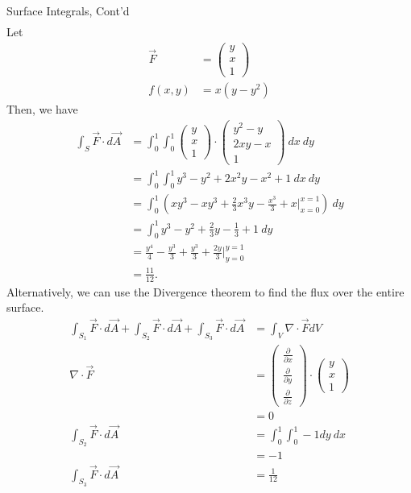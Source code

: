 \documentclass[8pt]{extarticle}
\begin{document}
\begin{problem}{Surface Integrals, Cont'd}
\begin{align*}
    \end{align*}
    Let
    \begin{align*}
      \vec{F} &= \begin{pmatrix}y\\x\\1\end{pmatrix}\\
      f(x,y) &= x(y-y^2) \tag*{$0\leq x,y \leq 1$}
    \end{align*}
    Then, we have
    \begin{align*}
      \int_{S}\vec{F} \cdot d\vec{A} &= \int_{0}^{1}\int_{0}^{1} \begin{pmatrix}y\\x\\1\end{pmatrix}\cdot \begin{pmatrix}y^2 - y\\2xy-x\\1\end{pmatrix}~dx~dy\\
                                     &= \int_{0}^{1}\int_{0}^{1} y^3 - y^2 + 2x^2y - x^2 + 1~dx~dy\\
                                     &= \int_{0}^{1} \left(xy^3 - xy^3 + \frac{2}{3}x^3y - \frac{x^3}{3} + x \biggr\vert_{x=0}^{x=1}\right)~dy\\
                                     &= \int_{0}^{1} y^3 - y^2 + \frac{2}{3}y - \frac{1}{3} + 1~dy\\
                                     &= \frac{y^4}{4} - \frac{y^3}{3} + \frac{y^3}{3} + \frac{2y}{3}\biggr\vert_{y=0}^{y=1}\\
                                     &= \frac{11}{12}.
    \end{align*}
    Alternatively, we can use the Divergence theorem to find the flux over the entire surface.
    \begin{align*}
      \int_{S_1}\vec{F} \cdot d\vec{A} + \int_{S_2}\vec{F}\cdot d\vec{A} + \int_{S_3}\vec{F} \cdot d\vec{A} &= \int_{V}\nabla \cdot \vec{F} dV\\
      \nabla \cdot \vec{F} &= \begin{pmatrix}\frac{\partial}{\partial x} \\ \frac{\partial}{\partial y}\\\frac{\partial}{\partial z}\end{pmatrix} \cdot \begin{pmatrix}y\\x\\1\end{pmatrix}\\
                           &= 0\\
      \int_{S_2}\vec{F} \cdot d\vec{A} &= \int_{0}^{1}\int_{0}^{1} -1 dy~dx\\
                                       &= -1\\
      \int_{S_3}\vec{F} \cdot d\vec{A} &= \frac{1}{12}
    \end{align*}
  \end{problem}
\end{document}

